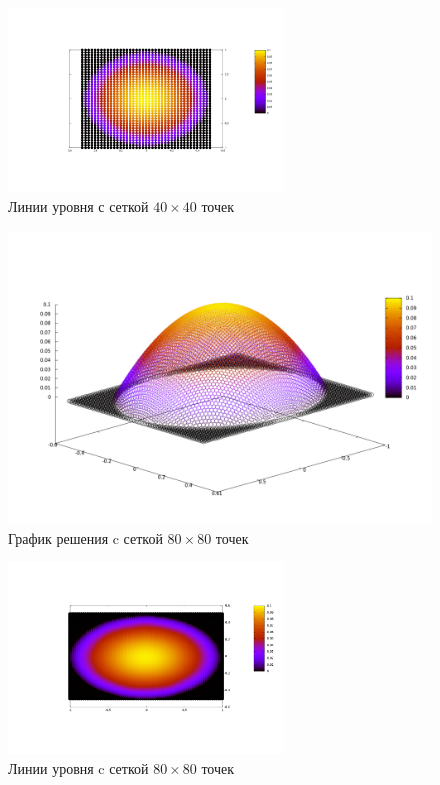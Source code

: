 \documentclass[oneside,final,14pt]{extreport}
\begin{document}
\begin{figure}[h!]
  \centering
  \includegraphics[width=0.65\textwidth]{picture2}
  \caption{Линии уровня с сеткой \( 40 \times 40 \) точек}
\end{figure}

\newpage
\noindent
\begin{figure}[h!]
  \centering
  \includegraphics[width=1.0\textwidth]{picture3}
  \caption{График решения c сеткой \( 80 \times 80 \) точек}
\end{figure}

\begin{figure}[h!]
  \centering
  \includegraphics[width=0.65\textwidth]{picture4}
  \caption{Линии уровня c сеткой \( 80 \times 80 \) точек}
\end{figure}
\end{document}
